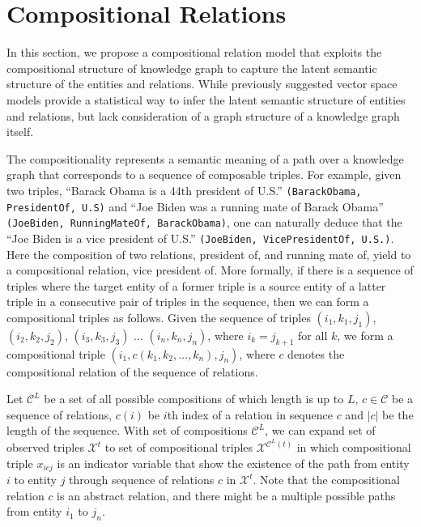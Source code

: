 \section{Compositional Relations}
\label{sec:comp}

In this section, we propose a compositional relation model that exploits the compositional structure of
knowledge graph to capture the latent semantic structure of the entities and relations.
While previously suggested vector space models provide a statistical way to infer the latent semantic
structure of entities and relations, but lack consideration of a graph structure of a knowledge graph itself.

The compositionality represents a semantic meaning of a path over a knowledge graph that corresponds to a
sequence of composable triples.
For example, given two triples, ``Barack Obama is a 44th president of U.S.'' \texttt{(BarackObama, PresidentOf,
U.S)} and ``Joe Biden was a running mate of Barack Obama'' \texttt{(JoeBiden, RunningMateOf, BarackObama)},
one can naturally deduce that the ``Joe Biden is a vice president of U.S.'' \texttt{(JoeBiden, VicePresidentOf, U.S.)}.
Here the composition of two relations, president of, and running mate of, yield to a compositional relation,
vice president of.
More formally, if there is a sequence of triples where the target entity of a former triple is a source entity of a
latter triple in a consecutive pair of triples in the sequence, then we can form a compositional triples
as follows.
Given the sequence of triples
$(i_1, k_1 ,j_1)$,  $(i_2, k_2, j_2)$, $(i_3, k_3, j_3)$ $\dots$ $(i_n, k_n, j_n)$, where $i_k = j_{k+1}$ for all $k
$,  we form a compositional triple $(i_1, {c}(k_1, k_2, \dots, k_n), j_n)$, where $c$ denotes the compositional
relation of the sequence of relations.

Let $\mathcal{C}^{L}$ be a set of all possible compositions of which length is up to $L$, $c \in \mathcal{C}$
be a sequence of relations, $c(i)$ be $i$th index of a relation in sequence $c$ and $|c|$ be the length of the
sequence. With set of compositions $\mathcal{C}^{L}$, we can expand set of observed triples
$\mathcal{X}^{t}$ to set of compositional triples $\mathcal{X}^{\mathcal{C}^{L}(t)}$ in which
compositional triple $x_{icj}$ is an
indicator variable that show the existence of the path from entity $i$ to entity $j$ through sequence
of relations
$c$ in $\mathcal{X}^{t}$. Note that the compositional relation $c$ is an abstract relation, and there might be a
multiple possible paths from entity $i_1$ to $j_n$.

